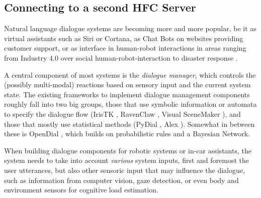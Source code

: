 \documentclass[a4paper]{report}
\begin{document}
\subsection{Connecting to a second HFC Server}









%
Natural language dialogue systems are becoming more and more popular, be it as
virtual assistants such as Siri or Cortana, as Chat Bots on websites providing
customer support, or as interface in human-robot interactions in areas ranging
from Industry 4.0 \citep{schwartz2016hybrid} over social human-robot-interaction
\citep{alize2010} to disaster response \citep{kruijff2015tradr}.

A central component of most systems is the \emph{dialogue manager}, which
controls the (possibly multi-modal) reactions based on sensory input and the
current system state. The existing frameworks to implement dialogue management
components roughly fall into two big groups, those that use symbolic
information or automata to specify the dialogue flow (IrisTK
\citep{2012iristk}, RavenClaw \citep{bohus2009ravenclaw}, Visual SceneMaker
\citep{gebhard2012visual}), and those that mostly use statistical methods
(PyDial \cite{ultes2017pydial}, Alex \citep{jurvcivcek2014alex}). Somewhat in
between these is OpenDial \citep{lison2015developing}, which builds on
probabilistic rules and a Bayesian Network.

When building dialogue components for robotic systems or in-car assistants, the system
needs to take into account \emph{various} system inputs, first and foremost the
user utterances, but also other sensoric input that may influence the dialogue,
such as information from computer vision, gaze detection, or even body and
environment sensors for cognitive load estimation.
\end{document}
